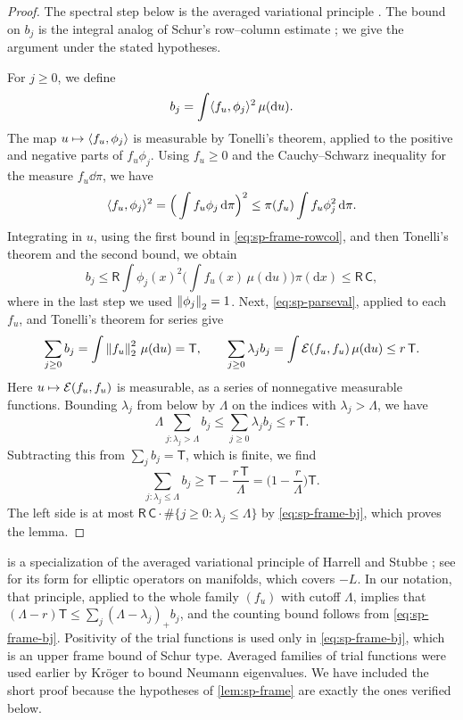 \begin{proof}
The spectral step below is the averaged variational principle \cite[Theorem~2.1]{ElSoufiHarrellIliasStubbe2017}. The bound on $b_j$ is the integral analog of Schur's row--column estimate \cite[Section~2, part~I, p.~6]{Schur1911}; we give the argument under the stated hypotheses.

For $j\ge0$, we define
\[
b_j=\int\langle f_u,\phi_j\rangle^2\,\mu(\mathrm du).
\]
The map $u\mapsto\langle f_u,\phi_j\rangle$ is measurable by Tonelli's theorem, applied to the positive and negative parts of $f_u\phi_j$. Using $f_u\ge0$ and the Cauchy--Schwarz inequality for the measure $f_u\dd\pi$, we have
\[
\langle f_u,\phi_j\rangle^2=\Big(\int f_u\phi_j\,\mathrm d\pi\Big)^2\le\pi(f_u)\int f_u\phi_j^2\,\mathrm d\pi.
\]
Integrating in $u$, using the first bound in \eqref{eq:sp-frame-rowcol}, and then Tonelli's theorem and the second bound, we obtain
\begin{equation}\label{eq:sp-frame-bj}
b_j\le\mathsf R\int\phi_j(x)^2\Big(\int f_u(x)\,\mu(\mathrm du)\Big)\pi(\mathrm dx)\le\mathsf R\,\mathsf C,
\end{equation}
where in the last step we used $\left\lVert\phi_j\right\rVert_2=1$. Next, \eqref{eq:sp-parseval}, applied to each $f_u$, and Tonelli's theorem for series give
\[
\sum_{j\ge0}b_j=\int\left\lVert f_u\right\rVert_2^2\,\mu(\mathrm du)=\mathsf T,
\qquad
\sum_{j\ge0}\lambda_jb_j=\int\mathcal E(f_u,f_u)\,\mu(\mathrm du)\le r\,\mathsf T.
\]
Here $u\mapsto\mathcal E(f_u,f_u)$ is measurable, as a series of nonnegative measurable functions. Bounding $\lambda_j$ from below by $\Lambda$ on the indices with $\lambda_j>\Lambda$, we have
\[
\Lambda\sum_{j:\lambda_j>\Lambda}b_j\le\sum_{j\ge0}\lambda_jb_j\le r\,\mathsf T.
\]
Subtracting this from $\sum_jb_j=\mathsf T$, which is finite, we find
\[
\sum_{j:\lambda_j\le\Lambda}b_j\ge\mathsf T-\frac{r\,\mathsf T}\Lambda=\Big(1-\frac r\Lambda\Big)\mathsf T.
\]
The left side is at most $\mathsf R\,\mathsf C\cdot\#\{j\ge0:\lambda_j\le\Lambda\}$ by \eqref{eq:sp-frame-bj}, which proves the lemma.
\end{proof}

 is a specialization of the averaged variational principle of Harrell and Stubbe \cite[Theorem~3.1]{HarrellStubbe2014}; see \cite[Theorem~2.1]{ElSoufiHarrellIliasStubbe2017} for its form for elliptic operators on manifolds, which covers $-L$.
In our notation, that principle, applied to the whole family $(f_u)$ with cutoff $\Lambda$, implies that $(\Lambda-r)\mathsf T\le\sum_j(\Lambda-\lambda_j)_+b_j$, and the counting bound follows from \eqref{eq:sp-frame-bj}. Positivity of the trial functions is used only in \eqref{eq:sp-frame-bj}, which is an upper frame bound of Schur type. Averaged families of trial functions were used earlier by Kr\"oger \cite{Kroger1992} to bound Neumann eigenvalues. We have included the short proof because the hypotheses of \cref{lem:sp-frame} are exactly the ones verified below.

